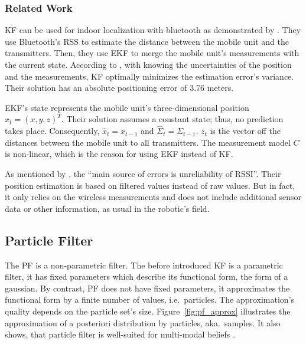 \subsubsection*{Related Work}
\acs{KF} can be used for indoor localization with bluetooth as demonstrated by \citet{kotanen:exp_local_pos_bt}. They use Bluetooth's \acs{RSS} to estimate the distance between the mobile unit and the transmitters. Then, they use \acl{EKF} to merge the mobile unit's measurements with the current state. According to \cite{kotanen:exp_local_pos_bt}, with knowing the uncertainties of the position and the measurements, \acs{KF} optimally minimizes the estimation error's variance. Their solution has an absolute positioning error of 3.76 meters.

\acs{EKF}'s state represents the mobile unit's three-dimensional position $x_t = (x, y, z)^T$. Their solution assumes a constant state; thus, no prediction takes place. Consequently, $\hat{x}_t = x_{t-1}$ and $\hat{\Sigma}_t = \Sigma_{t-1}$. $z_t$ is the vector off the distances between the mobile unit to all transmitters. The measurement model $C$ is non-linear, which is the reason for using \acs{EKF} instead of \acs{KF}.

As mentioned by \citet{kotanen:exp_local_pos_bt}, the ``main source of errors is unreliability of \acs{RSSI}''. Their position estimation is based on filtered values instead of raw values. But in fact, it only relies on the wireless measurements and does not include additional sensor data or other information, as usual in the robotic's field.

\subsection{Particle Filter}\label{sec:fund_pf}
The \ac{PF} is a non-parametric filter. The before introduced \acs{KF} is a parametric filter, it has fixed parameters which describe its functional form, the form of a gaussian. By contrast, \acs{PF} does not have fixed parameters, it approximates the functional form by a finite number of values, i.e.\ particles. The approximation's quality depends on the particle set's size. Figure~\ref{fig:pf_approx} illustrates the approximation of a posteriori distribution by particles, aka.\ samples. It also shows, that particle filter is well-suited for multi-modal beliefs \citep{thrun:prob_robo}.

